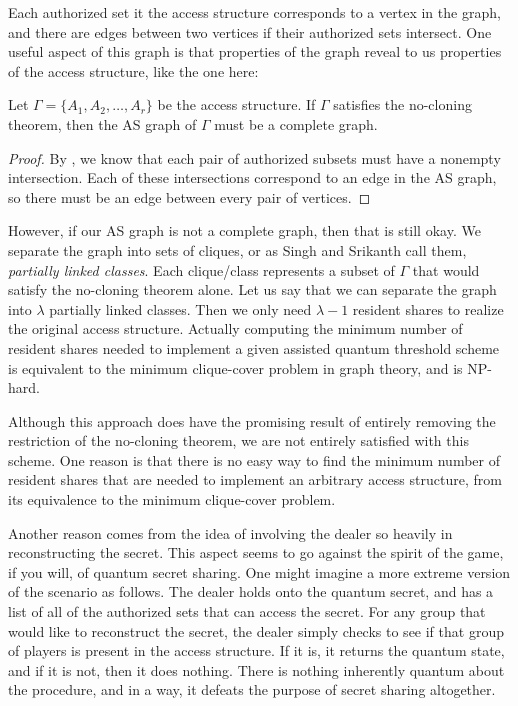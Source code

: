 Each authorized set it the access structure corresponds to a vertex in the graph, and there  are edges between two vertices if their authorized sets intersect. One useful aspect of this graph is that properties of the graph reveal to us properties of the access structure, like the one here:

\begin{proposition}
    \label{prop:complete-as-graph}
    Let $\Gamma = \{A_1,A_2,\dots,A_r\}$ be the access structure. If $\Gamma$ satisfies the no-cloning theorem, then the AS graph of $\Gamma$ must be a complete graph.
\end{proposition}

\begin{proof}
    By , we know that each pair of authorized subsets must have a nonempty intersection. Each of these intersections correspond to an edge in the AS graph, so there must be an edge between every pair of vertices.
\end{proof}

However, if our AS graph is not a complete graph, then that is still okay. We separate the graph into sets of cliques, or as Singh and Srikanth call them, \textit{partially linked classes}. Each clique/class represents a subset of $\Gamma$ that would satisfy the no-cloning theorem alone. Let us say that we can separate the graph into $\lambda$ partially linked classes. Then we only need $\lambda - 1$ resident shares to realize the original access structure. Actually computing the minimum number of resident shares needed to implement a given assisted quantum threshold scheme is equivalent to the minimum clique-cover problem in graph theory, and is NP-hard.

Although this approach does have the promising result of entirely removing the restriction of the no-cloning theorem, we are not entirely satisfied with this scheme. One reason is that there is no easy way to find the minimum number of resident shares that are needed to implement an arbitrary access structure, from its equivalence to the minimum clique-cover problem.

Another reason comes from the idea of involving the dealer so heavily in reconstructing the secret. This aspect seems to go against the spirit of the game, if you will, of quantum secret sharing. One might imagine a more extreme version of the scenario as follows. The dealer holds onto the quantum secret, and has a list of all of the authorized sets that can access the secret. For any group that would like to reconstruct the secret, the dealer simply checks to see if that group of players is present in the access structure. If it is, it returns the quantum state, and if it is not, then it does nothing. There is nothing inherently quantum about the procedure, and in a way, it defeats the purpose of secret sharing altogether.

